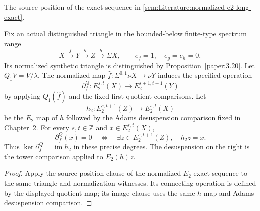 \begin{theorem}
\label{sem:ProofTools:e2-boundary-exact}
The source position of the exact sequence in
\ref{sem:Literature:normalized-e2-long-exact}.\par
Fix an actual distinguished triangle in the bounded-below finite-type spectrum range
\[
X\xrightarrow fY\xrightarrow gZ\xrightarrow h\Sigma X,
\qquad e_f=1,\quad e_g=e_h=0,
\]
Its normalized synthetic triangle is distinguished by
Proposition~\ref{paper:3.20}.
Let $Q_1V=V/\lambda$. The normalized map
$\widehat f:\Sigma^{0,1}\nu X\to\nu Y$ induces the specified operation
\[
\partial_f^Q:E_2^{s,t}(X)\longrightarrow E_2^{s+1,t+1}(Y)
\]
by applying $Q_1(\widehat f)$ and the fixed first-quotient comparisons.
Let
\[
h_2:E_2^{s,t+1}(Z)\longrightarrow E_2^{s,t}(X)
\]
be the $E_2$ map of $h$ followed by the Adams desuspension comparison
fixed in Chapter~2. For every $s,t\in\mathbb Z$ and $x\in E_2^{s,t}(X)$,
\[
\partial_f^Q(x)=0
\quad\Longleftrightarrow\quad
\exists z\in E_2^{s,t+1}(Z),\quad h_2z=x.
\]
Thus $\ker\partial_f^Q=\operatorname{im}h_2$ in these precise degrees.
The desuspension on the right is the tower comparison applied to
$E_2(h)z$.
\end{theorem}
\begin{proof}
Apply the source-position clause of the normalized $E_2$ exact
sequence to the same triangle and normalization witnesses. Its connecting
operation is defined by the displayed quotient map; its image clause
uses the same $h$ map and Adams desuspension comparison.
\end{proof}

